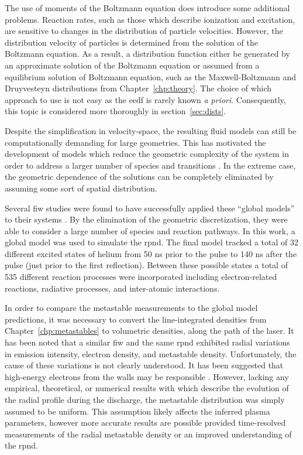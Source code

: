 The use of moments of the Boltzmann equation does introduce some additional
problems. Reaction rates, such as those which describe ionization and
excitation, are sensitive to changes in the distribution of particle velocities.
However, the distribution velocity of particles is determined from the solution
of the Boltzmann equation. As a result, a distribution function either be
generated by an approximate solution of the Boltzmann equation
\cite{Hagelaar2005} or assumed from a equilibrium solution of Boltzmann
equation, such as the Maxwell-Boltzmann and Druyvesteyn distributions from
Chapter~\ref{chp:theory}. The choice of which approach to use is not easy as the
\acs{eedf} is rarely known \emph{a priori}. Consequently, this topic is
considered more thoroughly in section~\ref{sec:dists}.

Despite the simplification in velocity-space, the resulting fluid models can
still be computationally demanding for large geometries. This has motivated the
development of models which reduce the geometric complexity of the system in
order to address a larger number of species and transitions
\cite{Lieberman2005}. In the extreme case, the geometric dependence of the
solutions can be completely eliminated by assuming some sort of spatial
distribution.

Several \acs{fiw} studies were found to have successfully applied these ``global
models'' to their systems \cite{Aleksandrov2007, Popov2011}. By the elimination
of the geometric discretization, they were able to consider a large number of
species and reaction pathways. In this work, a global model was used to simulate
the \acs{rpnd}. The final model tracked a total of 32 different excited states
of helium from 50 ns prior to the pulse to 140 ns after the pulse (just prior to
the first reflection). Between these possible states a total of 535 different
reaction processes were incorporated including electron-related reactions,
radiative processes, and inter-atomic interactions.

In order to compare the metastable measurements to the global model predictions,
it was necessary to convert the line-integrated densities from
Chapter~\ref{chp:metastables} to volumetric densities, along the path of the
laser. It has been noted that a similar \acs{fiw} \cite{Vasilyak1994} and the
same \acs{rpnd} \cite{Weatherford2012} exhibited radial variations in emission
intensity, electron density, and metastable density. Unfortunately, the cause of
these variations is not clearly understood. It has been suggested that
high-energy electrons from the walls may be responsible \cite{Weatherford2012a}.
However, lacking any empirical, theoretical, or numerical results with which
describe the evolution of the radial profile during the discharge, the
metastable distribution was simply assumed to be uniform. This assumption likely
affects the inferred plasma parameters, however more accurate results are
possible provided time-resolved measurements of the radial metastable density or
an improved understanding of the \acs{rpnd}.

